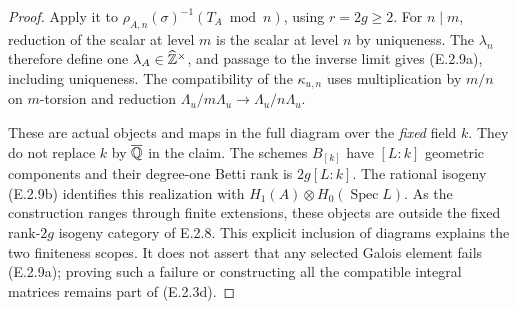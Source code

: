 \begin{proof}
Apply it to
$\rho_{A,n}(\sigma)^{-1}(T_A\bmod n)$, using $r=2g\ge2$.
For $n\mid m$, reduction of the scalar at level $m$ is the scalar
at level $n$ by uniqueness. The $\lambda_n$ therefore define one
$\lambda_A\in\widehat{\mathbb Z}^\times$, and passage to the inverse limit
gives (E.2.9a), including uniqueness. The compatibility of the
$\kappa_{u,n}$ uses multiplication by $m/n$ on $m$-torsion and
reduction $\Lambda_u/m\Lambda_u\to\Lambda_u/n\Lambda_u$.

These are actual objects and maps in the full diagram over the
\emph{fixed} field $k$. They do not replace $k$ by $\overline{\mathbb Q}$ in the
claim. The schemes $B_{[k]}$ have $[L:k]$ geometric components and
their degree-one Betti rank is $2g[L:k]$. The rational isogeny (E.2.9b)
identifies this realization with
$H_1(A)\otimes H_0(\operatorname{Spec}L)$.
As the construction ranges through finite extensions, these objects
are outside the fixed rank-$2g$ isogeny category of E.2.8.
This explicit inclusion of diagrams explains the two finiteness
scopes. It does not assert that any selected Galois element fails
(E.2.9a); proving such a failure or constructing all the compatible
integral matrices remains part of (E.2.3d).
\end{proof}

